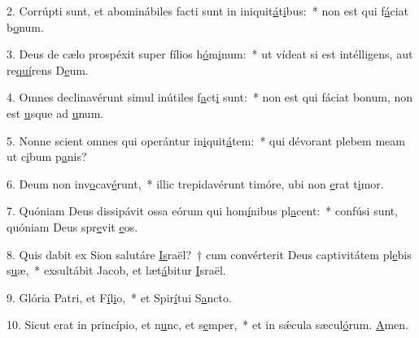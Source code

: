 2. Corrúpti sunt, et abominábiles facti sunt in iniquit\uline{á}t\uline{i}bus:~* non est qui f\uline{á}ciat b\uline{o}num.\par 
3. Deus de cælo prospéxit super fílios h\uline{ó}m\uline{i}num:~* ut vídeat si est intélligens, aut re\uline{quí}rens D\uline{e}um.\par 
4. Omnes declinavérunt simul inútiles f\uline{a}ct\uline{i} sunt:~* non est qui fáciat bonum, non est \uline{u}sque ad \uline{u}num.\par 
5. Nonne scient omnes qui operántur in\uline{i}quit\uline{á}tem:~* qui dévorant plebem meam ut c\uline{i}bum p\uline{a}nis?\par 
6. Deum non inv\uline{o}cav\uline{é}runt,~* illic trepidavérunt timóre, ubi non \uline{e}rat t\uline{i}mor.\par 
7. Quóniam Deus dissipávit ossa eórum qui hom\uline{í}nibus pl\uline{a}cent:~* confúsi sunt, quóniam Deus spr\uline{e}vit \uline{e}os.\par 
8. Quis dabit ex Sion salutáre \uline{Is}raël?~† cum convérterit Deus captivitátem pl\uline{e}bis s\uline{u}æ,~* exsultábit Jacob, et læt\uline{á}bitur \uline{I}sraël.\par 
9. Glória Patri, et F\uline{í}l\uline{i}o,~* et Spir\uline{í}tui S\uline{a}ncto.\par 
10. Sicut erat in princípio, et n\uline{u}nc, et s\uline{e}mper,~* et in sǽcula sæcul\uline{ó}rum. \uline{A}men.\par 
